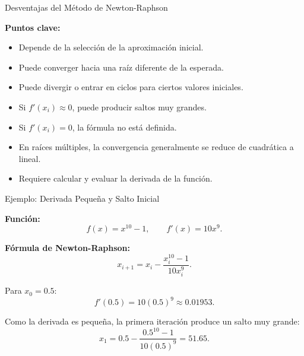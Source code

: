 \documentclass[../../main.tex]{subfiles}
\begin{document}

\begin{frame}{Desventajas del Método de Newton-Raphson}

\textbf{Puntos clave:}

\begin{itemize}
  \item Depende de la selección de la aproximación inicial.
  \item Puede converger hacia una raíz diferente de la esperada.
  \item Puede divergir o entrar en ciclos para ciertos valores iniciales.
  \item Si \(f'(x_i)\approx0\), puede producir saltos muy grandes.
  \item Si \(f'(x_i)=0\), la fórmula no está definida.
  \item En raíces múltiples, la convergencia generalmente se reduce
        de cuadrática a lineal.
  \item Requiere calcular y evaluar la derivada de la función.
\end{itemize}

\end{frame}



\begin{frame}{Ejemplo: Derivada Pequeña y Salto Inicial}

\textbf{Función:}
\[
f(x)=x^{10}-1,
\qquad
f'(x)=10x^9.
\]

\textbf{Fórmula de Newton-Raphson:}
\[
x_{i+1}
=
x_i-\frac{x_i^{10}-1}{10x_i^9}.
\]

Para \(x_0=0.5\):
\[
f'(0.5)=10(0.5)^9\approx0.01953.
\]

Como la derivada es pequeña, la primera iteración produce
un salto muy grande:
\[
x_1
=
0.5-\frac{0.5^{10}-1}{10(0.5)^9}
=
51.65.
\]

\end{frame}


\end{document}
